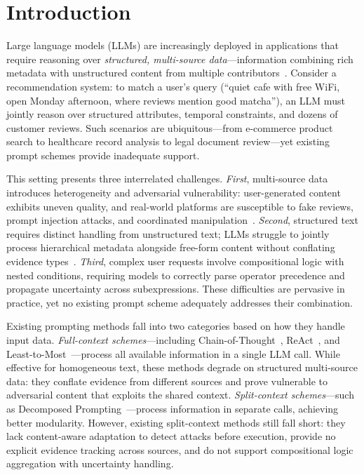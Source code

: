 \section{Introduction}

Large language models (LLMs) are increasingly deployed in applications that require reasoning over \emph{structured, multi-source data}---information combining rich metadata with unstructured content from multiple contributors~\cite{chen2025survey}.
Consider a recommendation system: to match a user's query (``quiet cafe with free WiFi, open Monday afternoon, where reviews mention good matcha''), an LLM must jointly reason over structured attributes, temporal constraints, and dozens of customer reviews.
Such scenarios are ubiquitous---from e-commerce product search to healthcare record analysis to legal document review---yet existing prompt schemes provide inadequate support.

This setting presents three interrelated challenges.
\emph{First}, multi-source data introduces heterogeneity and adversarial vulnerability: user-generated content exhibits uneven quality, and real-world platforms are susceptible to fake reviews, prompt injection attacks, and coordinated manipulation~\cite{greshake2023not}.
\emph{Second}, structured text requires distinct handling from unstructured text; LLMs struggle to jointly process hierarchical metadata alongside free-form content without conflating evidence types~\cite{zhao2024struceval,zhou2024structext}.
\emph{Third}, complex user requests involve compositional logic with nested conditions, requiring models to correctly parse operator precedence and propagate uncertainty across subexpressions.
These difficulties are pervasive in practice, yet no existing prompt scheme adequately addresses their combination.

Existing prompting methods fall into two categories based on how they handle input data.
\emph{Full-context schemes}---including Chain-of-Thought~\cite{wei2022chain}, ReAct~\cite{yao2022react}, and Least-to-Most~\cite{zhou2022least}---process all available information in a single LLM call.
While effective for homogeneous text, these methods degrade on structured multi-source data: they conflate evidence from different sources and prove vulnerable to adversarial content that exploits the shared context.
\emph{Split-context schemes}---such as Decomposed Prompting~\cite{khot2022decomposed}---process information in separate calls, achieving better modularity.
However, existing split-context methods still fall short: they lack content-aware adaptation to detect attacks before execution, provide no explicit evidence tracking across sources, and do not support compositional logic aggregation with uncertainty handling.

